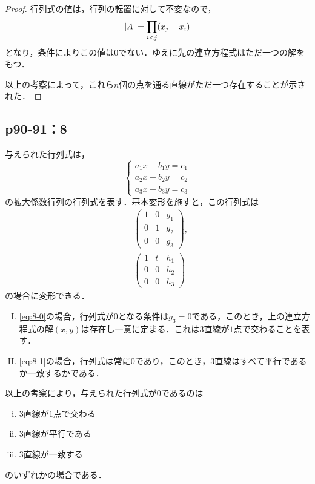 \documentclass[uplatex,dvipdfmx,a4paper,11pt,fleqn]{jsarticle}
\begin{document}
\begin{tleftbar}
\begin{proof}
        行列式の値は，行列の転置に対して不変なので，
        \[
            \abs{A}= \prod_{i < j} (x_j - x_i)
        \]
        となり，条件によりこの値は$0$でない．ゆえに先の連立方程式はただ一つの解をもつ．

        以上の考察によって，これら$n$個の点を通る直線がただ一つ存在することが示された．
    \end{proof}
\end{tleftbar}

\newpage 



\subsection*{p90-91：8}

\begin{tleftbar} 
    与えられた行列式は，
    \[
        \begin{cases}
            a_1 x + b_1 y =c_1 \\
            a_2 x + b_2 y =c_2 \\
            a_3 x + b_3 y =c_3 
        \end{cases}
    \]
    の拡大係数行列の行列式を表す．基本変形を施すと，この行列式は
    \begin{align} 
        & \begin{pmatrix}
            1 & 0 & g_1 \\
            0 & 1 & g_2 \\
            0 & 0 & g_3 
        \end{pmatrix}
        \label{eq:8-0}
        , \\
        &\begin{pmatrix} 
            1 & t & h_1 \\
            0 & 0 & h_2 \\
            0 & 0 & h_3 
        \end{pmatrix}
        \label{eq:8-1}
    \end{align}
    の場合に変形できる．

    \begin{enumerate}[(I)]
        \item \eqref{eq:8-0}の場合，行列式が$0$となる条件は$g_3 =0$である，このとき，上の連立方程式の解$(x,y)$は存在し一意に定まる．これは$3$直線が$1$点で交わることを表す．
        \item \eqref{eq:8-1}の場合，行列式は常に$0$であり，このとき，3直線はすべて平行であるか一致するかである．
    \end{enumerate}

    以上の考察により，与えられた行列式が$0$であるのは
    \begin{enumerate}[(i)]
    \item 3直線が$1$点で交わる
    \item 3直線が平行である
    \item 3直線が一致する
    \end{enumerate}
    のいずれかの場合である．
\end{tleftbar}
\end{document}
